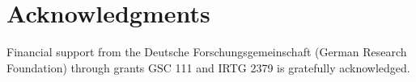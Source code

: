 \documentclass[acmsmall,screen, review]{acmart}
\begin{document}
\section*{Acknowledgments}

Financial support from the Deutsche Forschungsgemeinschaft (German Research Foundation) through grants GSC 111 and IRTG 2379 is gratefully acknowledged. 
%
%

%






\end{document}
